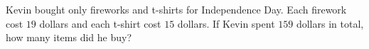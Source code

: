 Kevin bought only fireworks and t-shirts for Independence Day. Each firework cost $19$ dollars and each t-shirt cost $15$ dollars. If Kevin spent $159$ dollars in total, how many items did he buy?
